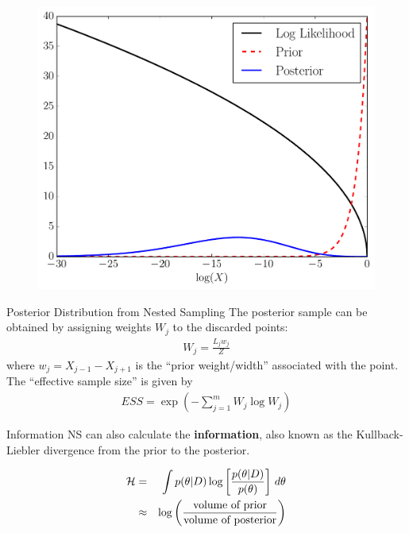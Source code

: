 \documentclass{beamer}
\begin{document}
\begin{frame}

\begin{figure}
\centering
\includegraphics[scale=0.35]{figures/nested2.pdf}
\end{figure}
\end{frame}


\begin{frame}[t]{Posterior Distribution from Nested Sampling}
The posterior sample can be obtained by assigning weights $W_j$ to the
discarded points:
\begin{align*}
W_{j} = \frac{L_{j} w_{j}}{Z} 
\end{align*}
where $w_{j}=X_{j-1} - X_{j+1}$ is the ``prior weight/width'' associated with the
point. The ``effective sample size'' is given by
\begin{align*}
ESS = \exp \left( - \sum_{j=1}^{m} W_j \log W_j \right)
\end{align*}

\end{frame}

\begin{frame}[t]{Information}
NS can also calculate the {\bf information}, also known as the Kullback-Liebler
divergence from the prior to the posterior.

\begin{eqnarray*}
\mathcal{H} &=& \int p(\theta | D) \log\left[\frac{p(\theta | D)}{p(\theta)}\right]
\, d\theta\\
&\approx& \log\left(
\frac{\textnormal{volume of prior}}{\textnormal{volume of posterior}}
\right)
\end{eqnarray*}
\end{frame}
\end{document}
